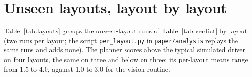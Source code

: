 \documentclass[11pt]{article}
\begin{document}
\section{Unseen layouts, layout by layout}\label{app:layouts}

Table~\ref{tab:layouts} groups the unseen-layout runs of Table~\ref{tab:verdict} by layout (two runs
per layout; the script \texttt{per\_layout.py} in \texttt{paper/analysis} replays the same runs and adds
none). The planner
scores above the typical simulated driver on four layouts, the same on three and below on three; its
per-layout means range from 1.5 to 4.0, against 1.0 to 3.0 for the vision routine.

\begin{table}[h]
\centering\small
{}
\caption{Mean points (of 6) per unseen layout, simulated.}
\label{tab:layouts}
\end{table}
\end{document}
